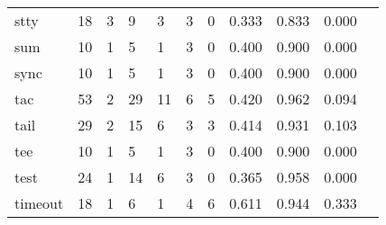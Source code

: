 \begin{longtable}{lp{1.10cm}p{1.10cm}p{1.10cm}p{1.10cm}p{1.10cm}p{1.10cm}p{1.10cm}p{1.10cm}p{1.10cm}p{1.10cm}}
stty      &                     18 &                                  3 &                                 9 &                                3 &                                 3 &                               0 &                          0.333 &                                 0.833 &                               0.000 \\
sum       &                     10 &                                  1 &                                 5 &                                1 &                                 3 &                               0 &                          0.400 &                                 0.900 &                               0.000 \\
sync      &                     10 &                                  1 &                                 5 &                                1 &                                 3 &                               0 &                          0.400 &                                 0.900 &                               0.000 \\
tac       &                     53 &                                  2 &                                29 &                               11 &                                 6 &                               5 &                          0.420 &                                 0.962 &                               0.094 \\
tail      &                     29 &                                  2 &                                15 &                                6 &                                 3 &                               3 &                          0.414 &                                 0.931 &                               0.103 \\
tee       &                     10 &                                  1 &                                 5 &                                1 &                                 3 &                               0 &                          0.400 &                                 0.900 &                               0.000 \\
test      &                     24 &                                  1 &                                14 &                                6 &                                 3 &                               0 &                          0.365 &                                 0.958 &                               0.000 \\
timeout   &                     18 &                                  1 &                                 6 &                                1 &                                 4 &                               6 &                          0.611 &                                 0.944 &                               0.333 \\

\end{longtable}
